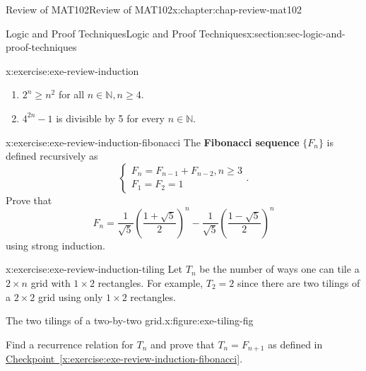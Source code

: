\documentclass[oneside,10pt,]{book}
\newcommand{\xreffont}{\relax}
\newcommand{\terminology}[1]{\textbf{#1}}
\numberwithin{equation}{section}
\begin{document}
\begin{chapterptx}{Review of MAT102}{}{Review of MAT102}{}{}{x:chapter:chap-review-mat102}
\begin{sectionptx}{Logic and Proof Techniques}{}{Logic and Proof Techniques}{}{}{x:section:sec-logic-and-proof-techniques}
\begin{inlineexercise}{}{x:exercise:exe-review-induction}
\begin{enumerate}[label=(\alph*)]
\item{}\(2^n \geq n^2\) for all \(n \in \mathbb{N}, n \geq 4\).%
\item{}\(4^{2n} -1\) is divisible by 5 for every \(n \in \mathbb{N}\).%
\end{enumerate}
\end{inlineexercise}
\begin{inlineexercise}{}{x:exercise:exe-review-induction-fibonacci}%
The \terminology{Fibonacci sequence} \(\{F_n\}\) is defined recursively as%
\begin{equation*}
\begin{cases} F_n = F_{n-1} + F_{n-2}, n \geq 3 \\
F_1 = F_2 = 1 \end{cases}\text{.}
\end{equation*}
Prove that%
\begin{equation*}
F_n = \frac{1}{\sqrt{5}}\left(\frac{1+\sqrt{5}}{2}\right)^n - \frac{1}{\sqrt{5}}\left(\frac{1-\sqrt{5}}{2}\right)^n
\end{equation*}
using strong induction.%
\end{inlineexercise}
\begin{inlineexercise}{}{x:exercise:exe-review-induction-tiling}%
Let \(T_n\) be the number of ways one can tile a \(2 \times n\) grid with \(1 \times 2\) rectangles. For example, \(T_2 = 2\) since there are two tilings of a \(2 \times 2\) grid using only \(1 \times 2\) rectangles.%
\begin{figureptx}{The two tilings of a two-by-two grid.}{x:figure:exe-tiling-fig}{}%
\begin{image}{0.25}{0.5}{0.25}%
%
\end{image}%
\tcblower
\end{figureptx}%
Find a recurrence relation for \(T_n\) and prove that \(T_n = F_{n+1}\) as defined in \hyperref[x:exercise:exe-review-induction-fibonacci]{Checkpoint~{\xreffont\ref{x:exercise:exe-review-induction-fibonacci}}}.%

\end{inlineexercise}
\end{sectionptx}
\end{chapterptx}
\end{document}
